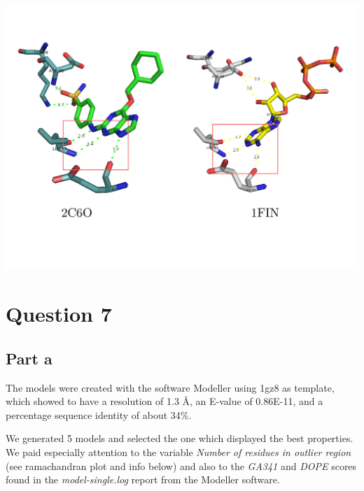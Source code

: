 \documentclass[11pt, a4paper,titlepage]{article}
\begin{document}
\includegraphics[width=17cm]{./Figures/6.pdf}

\section*{Question 7}
\subsection*{Part a}

The models were created with the software Modeller \cite{Modeller} using 1gz8 as template, which
showed to have a resolution of 1.3 \AA, an E-value of 0.86E-11, and a
percentage sequence identity of about 34\%. 

We generated 5 models and selected the one which displayed the best
properties. We paid especially attention to the variable \emph{Number
  of residues in outlier region} (see ramachandran plot and info
below) and also to the \emph{GA341} and \emph{DOPE} scores found in
the \emph{model-single.log} report from the Modeller software.
\end{document}
